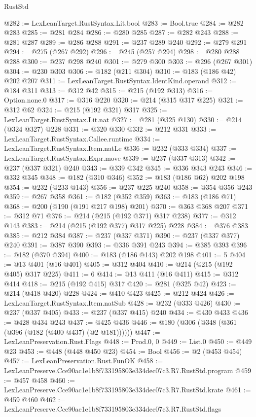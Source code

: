 \begin{lexlean}{RustStd}
\begin{coremodule}
@282 := LexLeanTarget.RustSyntax.Lit.bool
@283 := Bool.true
@284 := @282 @283
@285 := @281 @284
@286 := @280 @285
@287 := @282 @243
@288 := @281 @287
@289 := @286 @288
@291 := @237 @289 @240
@292 := @279 @291
@294 := @275 (@267 @292)
@296 := @245 (@257 @294)
@298 := @280 @288 @288
@300 := @237 @298 @240
@301 := @279 @300
@303 := @296 (@267 @301)
@304 := @230 @303
@306 := @182 (@211 @304)
@310 := @183 (@186 @42) @202 @207
@311 := LexLeanTarget.RustSyntax.IdentKind.operand
@312 := @184 @311
@313 := @312 @42
@315 := @215 (@192 @313)
@316 := Option.none.{0}
@317 := @316 @220
@320 := @214 (@315 @317 @225)
@321 := @312 @62
@324 := @215 (@192 @321) @317
@325 := LexLeanTarget.RustSyntax.Lit.nat
@327 := @281 (@325 @130)
@330 := @214 (@324 @327) @228
@331 := @320 @330
@332 := @212 @331
@333 := LexLeanTarget.RustSyntax.Callee.runtime
@334 := LexLeanTarget.RustSyntax.Item.natLe
@336 := @232 (@333 @334)
@337 := LexLeanTarget.RustSyntax.Expr.move
@339 := @237 (@337 @313)
@342 := @237 (@337 @321) @240
@343 := @339 @342
@345 := @336 @343 @243
@346 := @332 @345
@348 := @182 (@310 @346)
@352 := @183 (@186 @62) @202 @198
@354 := @232 (@233 @143)
@356 := @237 @225 @240
@358 := @354 @356 @243
@359 := @267 @358
@361 := @182 (@352 @359)
@363 := @183 (@186 @71)
@368 := @200 (@190 (@191 @217 @198) @201)
@370 := @363 @368 @207
@371 := @312 @71
@376 := @214 (@215 (@192 @371) @317 @238)
@377 := @312 @143
@383 := @214 (@215 (@192 @377) @317 @225) @228
@384 := @376 @383
@385 := @212 @384
@387 := @237 (@337 @371)
@390 := @237 (@337 @377) @240
@391 := @387 @390
@393 := @336 @391 @243
@394 := @385 @393
@396 := @182 (@370 @394)
@400 := @183 (@186 @143) @202 @198
@401 := 5
@404 := @13 @401 (@16 @401)
@405 := @312 @404
@410 := @214 (@215 (@192 @405) @317 @225)
@411 := 6
@414 := @13 @411 (@16 @411)
@415 := @312 @414
@418 := @215 (@192 @415) @317
@420 := @281 (@325 @42)
@423 := @214 (@418 @420) @228
@424 := @410 @423
@425 := @212 @424
@426 := LexLeanTarget.RustSyntax.Item.natSub
@428 := @232 (@333 @426)
@430 := @237 (@337 @405)
@433 := @237 (@337 @415) @240
@434 := @430 @433
@436 := @428 @434 @243
@437 := @425 @436
@446 := @180 (@306 (@348 (@361 (@396 (@182 (@400 @437) (@2 @181))))))
@447 := LexLeanPreservation.Rust.Flags
@448 := Prod.{0, 0}
@449 := List.{0}
@450 := @449 @23
@453 := @448 (@448 @450 @23)
@454 := Bool
@456 := @2 (@453 @454)
@457 := LexLeanPreservation.Rust.FunOK
@458 := LexLeanPreserve.Cce90ac1e1b8f733195803e334dec07c3.R7.RustStd.program
@459 := @457 @458
@460 := LexLeanPreserve.Cce90ac1e1b8f733195803e334dec07c3.R7.RustStd.krate
@461 := @459 @460
@462 := LexLeanPreserve.Cce90ac1e1b8f733195803e334dec07c3.R7.RustStd.flags

\end{coremodule}
\end{lexlean}
